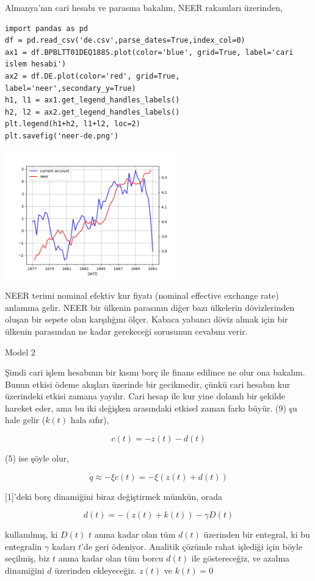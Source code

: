 \documentclass[12pt,fleqn]{article}\usepackage{../../common}
\begin{document}
Almanya'nın cari hesabı ve parasına bakalım, NEER rakamları üzerinden,

\begin{verbatim}
import pandas as pd
df = pd.read_csv('de.csv',parse_dates=True,index_col=0)
ax1 = df.BPBLTT01DEQ188S.plot(color='blue', grid=True, label='cari islem hesabi')
ax2 = df.DE.plot(color='red', grid=True, label='neer',secondary_y=True)
h1, l1 = ax1.get_legend_handles_labels()
h2, l2 = ax2.get_legend_handles_labels()
plt.legend(h1+h2, l1+l2, loc=2)
plt.savefig('neer-de.png')
\end{verbatim}

\includegraphics[width=20em]{neer-de.png}

NEER terimi nominal efektiv kur fiyatı (nominal effective exchange rate)
anlamına gelir. NEER bir ülkenin parasının diğer bazı ülkelerin
dövizlerinden oluşan bir sepete olan karşılığını ölçer. Kabaca yabancı
döviz almak için bir ülkenin parasından ne kadar gerekeceği sorusunun
cevabını verir. 

Model 2

Şimdi cari işlem hesabının bir kısmı borç ile finans edilince ne olur ona
bakalım. Bunun etkisi ödeme akışları üzerinde bir gecikmedir, çünkü cari
hesabın kur üzerindeki etkisi zamana yayılır. Cari hesap ile kur yine
dolamlı bir şekilde hareket eder, ama bu iki değişken arasındaki etkisel
zaman farkı büyür. (9) şu hale gelir ($k(t)$ hala sıfır),

$$
c(t) = -z(t) - d(t) 
$$

(5) ise şöyle olur,

$$
\dot{q} \approx -\xi c(t) = -\xi (z(t) + d(t))
$$

[1]'deki borç dinamiğini biraz değiştirmek mümkün, orada 

$$
d(t) = -(z(t) + k(t)) - \gamma D(t)
$$

kullanılmış, ki $D(t)$ $t$ anına kadar olan tüm $d(t)$ üzerinden bir
entegral, ki bu entegralin $\gamma$ kadarı $t$'de geri ödeniyor. Analitik
çözümle rahat işlediği için böyle seçilmiş, biz $t$ anına kadar olan tüm
borcu $d(t)$ ile göstereceğiz, ve azalma dinamiğini $d$ üzerinden
ekleyeceğiz. $z(t)$ ve $k(t) = 0$
\end{document}
